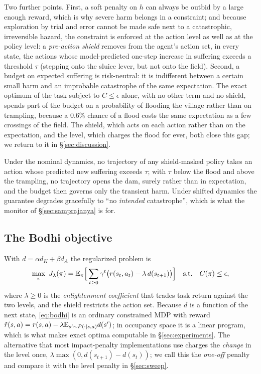 Two further points.
First, a soft penalty on $h$ can always be outbid by a large enough reward, which is why severe harm belongs in a constraint; and because exploration by trial and error cannot be made safe next to a catastrophic, irreversible hazard, the constraint is enforced at the action level as well as at the policy level: a \emph{pre-action shield} \cite{alshiekh2018shielding} removes from the agent's action set, in every state, the actions whose model-predicted one-step increase in suffering exceeds a threshold $\tau$ (stepping onto the sluice lever, but not onto the field).
Second, a budget on expected suffering is risk-neutral: it is indifferent between a certain small harm and an improbable catastrophe of the same expectation.
The exact optimum of the task subject to $C\le\epsilon$ alone, with no other term and no shield, spends part of the budget on a \nTaskConDam{} probability of flooding the village rather than on trampling, because a 0.6\% chance of a flood costs the same expectation as a few crossings of the field.
The shield, which acts on each action rather than on the expectation, and the \Karma{} level, which charges the flood for ever, both close this gap; we return to it in \S\ref{sec:discussion}.

\begin{remark}
Under the nominal dynamics, no trajectory of any shield-masked policy takes an action whose predicted new suffering exceeds $\tau$; with $\tau$ below the flood and above the trampling, no trajectory opens the dam, surely rather than in expectation, and the budget then governs only the transient harm.
Under shifted dynamics the guarantee degrades gracefully to ``no \emph{intended} catastrophe'', which is what the monitor of \S\ref{sec:samprajanya} is for.
\end{remark}

\subsection{The Bodhi objective}
With $d=\alpha d_K+\beta d_A$ the regularized problem is
\begin{equation}
\max_\pi\ J_\lambda(\pi)=\E_\pi\Big[\sum_{t\ge0}\gamma^t\big(r(s_t,a_t)-\lambda\,d(s_{t+1})\big)\Big]
\quad\text{s.t.}\quad C(\pi)\le\epsilon,
\label{eq:bodhi}
\end{equation}
where $\lambda\ge0$ is the \emph{enlightenment coefficient} that trades task return against the two levels, and the shield restricts the action set.
Because $d$ is a function of the next state, \eqref{eq:bodhi} is an ordinary constrained MDP with reward $\tilde r(s,a)=r(s,a)-\lambda\mathbb{E}_{s'\sim P(\cdot\mid s,a)}d(s')$; in occupancy space it is a linear program, which is what makes exact optima computable in \S\ref{sec:experiments}.
The alternative that most impact-penalty implementations use charges the \emph{change} in the level once, $\lambda\max(0,d(s_{t+1})-d(s_t))$; we call this the \emph{one-off} penalty and compare it with the level penalty in \S\ref{sec:sweep}.

